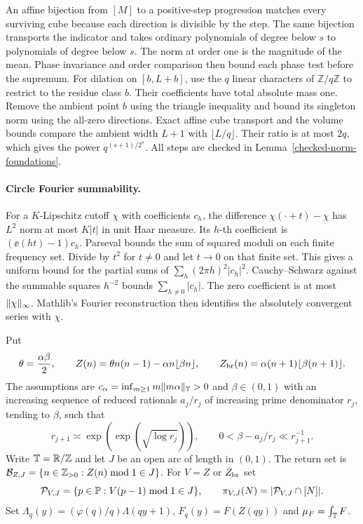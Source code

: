 An affine bijection from $[M]$ to a positive-step progression matches
every surviving cube because each direction is divisible by the step.
The same bijection transports the indicator and takes ordinary
polynomials of degree below $s$ to polynomials of degree below $s$.
The norm at order one is the magnitude of the mean. Phase invariance
and order comparison then bound each phase test before the supremum.
For dilation on $[b,L+b]$, use the $q$ linear characters of
$\mathbb Z/q\mathbb Z$ to restrict to the residue class $b$. Their
coefficients have total absolute mass one. Remove the ambient point
$b$ using the triangle inequality and bound its singleton norm using
the all-zero directions. Exact affine cube transport and the volume
bounds compare the ambient width $L+1$ with $\lfloor L/q\rfloor$.
Their ratio is at most $2q$, which gives the power $q^{(s+1)/2^s}$.
All steps are checked in Lemma~\ref{checked-norm-foundations}.

\paragraph{Circle Fourier summability.}
For a $K$-Lipschitz cutoff $\chi$ with coefficients $c_h$, the difference
$\chi(\cdot+t)-\chi$ has $L^2$ norm at most $K|t|$ in unit Haar
measure. Its $h$-th coefficient is $(\ee(ht)-1)c_h$.
Parseval bounds the sum of squared moduli on each finite frequency
set. Divide by $t^2$ for $t\ne0$ and let $t\to0$ on that finite set.
This gives a uniform bound for the partial sums of
$\sum_h (2\pi h)^2|c_h|^2$. Cauchy--Schwarz against the summable
squares $h^{-2}$ bounds $\sum_{h\ne0}|c_h|$. The zero coefficient
is at most $\lVert\chi\rVert_\infty$. Mathlib's Fourier reconstruction
then identifies the absolutely convergent series with $\chi$.

\begin{definition}\label{selector}
Put
\[
 \theta=\frac{\alpha\beta}{2},\qquad
 Z(n)=\theta n(n-1)-\alpha n\lfloor\beta n\rfloor,
 \qquad Z_{\rm br}(n)=\alpha(n+1)\lfloor\beta(n+1)\rfloor .
\]
The assumptions are $c_\alpha=\inf_{m\ge1}m\lVert m\alpha\rVert_{\mathbb T}>0$ and
$\beta\in(0,1)$ with an increasing sequence of reduced rationals
$a_j/r_j$ of increasing prime denominator $r_j$, tending to $\beta$,
such that
\[
 r_{j+1}\asymp\exp(\exp(\sqrt{\log r_j})),\qquad
 0<\beta-a_j/r_j\ll r_{j+1}^{-1}.
\]
Write $\mathbb T=\mathbb R/\mathbb Z$ and let $J$ be an open arc of length in $(0,1)$.
The return set is
$\mathcal B_{Z,J}=\{n\in\mathbb Z_{>0}:Z(n)\bmod1\in J\}$.
For $V=Z$ or $Z_{\rm br}$ set
\[
 \mathcal P_{V,J}=\{p\in\mathbb P:V(p-1)\bmod1\in J\},\qquad
 \pi_{V,J}(N)=|\mathcal P_{V,J}\cap[N]|.
\]
Set $\Lambda_q(y)=(\varphi(q)/q)\Lambda(qy+1)$,
$F_q(y)=F(Z(qy))$ and $\mu_F=\int_\mathbb T F$.
\end{definition}

